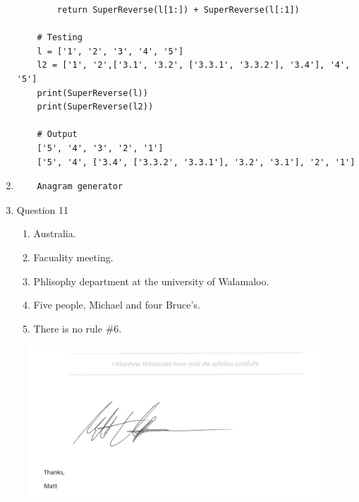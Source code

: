 \documentclass{article}
\begin{document}
\begin{enumerate}
\begin{lstlisting}
        return SuperReverse(l[1:]) + SuperReverse(l[:1])
        
    # Testing
    l = ['1', '2', '3', '4', '5']
    l2 = ['1', '2',['3.1', '3.2', ['3.3.1', '3.3.2'], '3.4'], '4', '5']
    print(SuperReverse(l))
    print(SuperReverse(l2))

    # Output    
    ['5', '4', '3', '2', '1']
    ['5', '4', ['3.4', ['3.3.2', '3.3.1'], '3.2', '3.1'], '2', '1']
  \end{lstlisting}

  \item 
  \begin{lstlisting}
    Anagram generator
  \end{lstlisting}

  \item Question 11
  \begin{enumerate}
    \item Australia.
    \item Facuality meeting.
    \item Phlisophy department at the university of Walamaloo.
    \item Five people, Michael and four Bruce's. 
    \item There is no rule \#6.
  \end{enumerate}

\end{enumerate}

\pagebreak

\begin{figure}
  \includegraphics[width=\linewidth]{Statement.png}
  \label{fig:Statement}
\end{figure}
\end{document}
